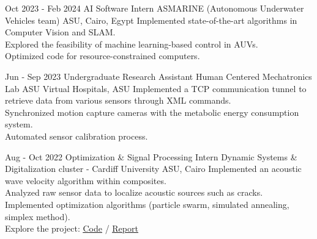 \documentclass[hidelinks]{report}
\begin{document}
\vspace{4mm}


\entry
    {Oct 2023 - Feb 2024}
    {AI Software Intern}
    {ASMARINE (Autonomous Underwater Vehicles team)}
    {ASU, Cairo, Egypt}
    {
      \textbullet Implemented state-of-the-art algorithms in Computer Vision and SLAM. \\
      \textbullet Explored the feasibility of machine learning-based control in AUVs. \\
      \textbullet Optimized code for resource-constrained computers.
    }

\entry
    {Jun - Sep 2023}
    {Undergraduate Research Assistant}
    {Human Centered Mechatronics Lab}
    {ASU Virtual Hospitals, ASU}
    {
      \textbullet Implemented a TCP communication tunnel to retrieve data from various sensors through XML commands. \\
      \textbullet Synchronized motion capture cameras with the metabolic energy consumption system. \\
      \textbullet Automated sensor calibration process.
    }

\entry
    {Aug - Oct 2022}
    {Optimization \& Signal Processing Intern}
    {Dynamic Systems \& Digitalization cluster - Cardiff University}
    {ASU, Cairo}
    {
      \textbullet Implemented an acoustic wave velocity algorithm within composites.\\
      \textbullet Analyzed raw sensor data to localize acoustic sources such as cracks. \\
      \textbullet Implemented optimization algorithms (particle swarm, simulated annealing, simplex method).\\
      \textbullet Explore the project: 
      \href{\github/AE-software.git}{\underline{Code}} / %
      \href{\github/AE-software/blob/master/Final-Report/Report.pdf}{\underline{Report}}
    }

\vspace{2mm}



\vspace{2mm}
\end{document}
